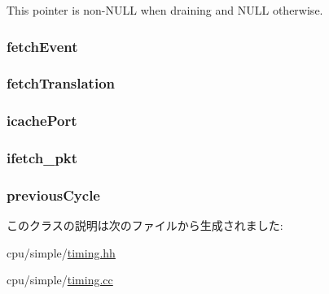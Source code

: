 This pointer is non-\/NULL when draining and NULL otherwise. \hypertarget{classTimingSimpleCPU_a17e7c383c8fb3d4dc450d79c15dd1061}{
\subsubsection[{fetchEvent}]{ {\bf fetchEvent}}}
\label{classTimingSimpleCPU_a17e7c383c8fb3d4dc450d79c15dd1061}
\hypertarget{classTimingSimpleCPU_abc9a320383d8f8241113fe01f333d5ca}{
\subsubsection[{fetchTranslation}]{ {\bf fetchTranslation}}}
\label{classTimingSimpleCPU_abc9a320383d8f8241113fe01f333d5ca}
\hypertarget{classTimingSimpleCPU_a290723656a84b9cc90dfce377af9aad0}{
\subsubsection[{icachePort}]{ {\bf icachePort}}}
\label{classTimingSimpleCPU_a290723656a84b9cc90dfce377af9aad0}
\hypertarget{classTimingSimpleCPU_a82097539e30887f0ad11d7a218c5bcca}{
\subsubsection[{ifetch\_\-pkt}]{ {\bf ifetch\_\-pkt}}}
\label{classTimingSimpleCPU_a82097539e30887f0ad11d7a218c5bcca}
\hypertarget{classTimingSimpleCPU_acb8e08ce453c8db11437d6cf9b0167bf}{
\subsubsection[{previousCycle}]{ {\bf previousCycle}}}
\label{classTimingSimpleCPU_acb8e08ce453c8db11437d6cf9b0167bf}


このクラスの説明は次のファイルから生成されました:\begin{DoxyCompactItemize}
\item 
cpu/simple/\hyperlink{timing_8hh}{timing.hh}\item 
cpu/simple/\hyperlink{timing_8cc}{timing.cc}\end{DoxyCompactItemize}
